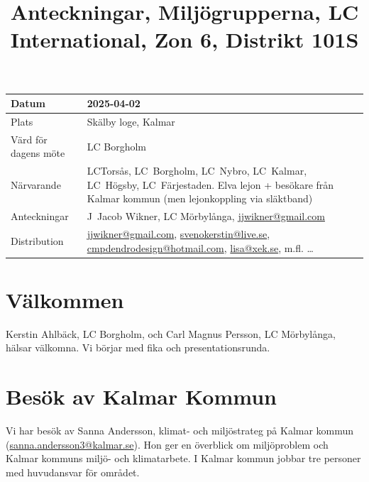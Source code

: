 \documentclass[12pt,a4paper]{article}
\title{Anteckningar, Miljögrupperna, LC International, Zon 6, Distrikt 101S}
\author{} %
\begin{document}
\maketitle
\pagestyle{fancy}
\fancyhead{} %
\fancyfoot{} %
\fancyfoot[LE,RO]{\thepage}

\begin{table}[h]
  \center
  \begin{tabular}{p{4cm}|p{11cm}}
    Datum & 2025-04-02 \\ \hline
    Plats & Skälby loge, Kalmar \\ \hline
    Värd för dagens möte &  LC Borgholm \\ \hline
    Närvarande  &  LCTorsås, LC~Borgholm, LC~Nybro, LC~Kalmar, LC~Högsby, LC~Färjestaden. \newline
    Elva lejon + besökare från Kalmar kommun (men lejonkoppling via släktband) \\ \hline
    Anteckningar & J~Jacob Wikner, LC Mörbylånga, \href{mailto:jjwikner@gmail.com}{jjwikner@gmail.com} \\ \hline
    Distribution & \href{mailto:jjwikner@gmail.com}{jjwikner@gmail.com}, \href{mailto:svenokerstin@live.se}{svenokerstin@live.se}, \href{mailto:cmpdendrodesign@hotmail.com}{cmpdendrodesign@hotmail.com}, \href{mailto:lisa@xek.se}{lisa@xek.se}, m.fl. \ldots
   \end{tabular}
\end{table}


\section{Välkommen}

Kerstin Ahlbäck, LC Borgholm, och Carl Magnus Persson, LC Mörbylånga, hälsar välkomna.
Vi börjar med fika och presentationsrunda.

\section{Besök av Kalmar Kommun}

Vi har besök av Sanna Andersson, klimat- och miljöstrateg på Kalmar kommun (\href{sanna.andersson3@kalmar.se}{sanna.andersson3@kalmar.se}).
Hon ger en överblick om miljöproblem och Kalmar kommuns miljö- och klimatarbete.
I Kalmar kommun jobbar tre personer med huvudansvar för området.
\end{document}
